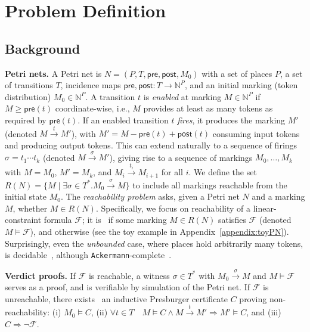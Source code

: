 \vspace{-3.0pt}
\section{Problem Definition}
\label{sec:problem-definition}


\subsection{Background}
\label{subsec:background}

\textbf{Petri nets.} 
A Petri net is $N=(P,T,\mathsf{pre},\mathsf{post},M_0)$ with a set of places $P$, a set of transitions $T$, incidence maps $\mathsf{pre},\mathsf{post}:T\to\mathbb N^P$, and an initial marking (token distribution) $M_0\in\mathbb N^P$.  
A transition $t$ is \textit{enabled} at marking $M \in \mathbb N^P$ if $M\ge \mathsf{pre}(t)$ coordinate-wise, i.e., $M$ provides at least as many tokens as required by $\mathsf{pre}(t)$.
%
If an enabled transition \(t\) \textit{fires}, it produces the marking $M'$ (denoted $M\xrightarrow{t}M'$), with $M'= M - \mathsf{pre}(t) + \mathsf{post}(t)$ consuming input tokens and producing output tokens.
%
This can extend naturally to a sequence of firings $\sigma = t_1\cdots t_k$ (denoted $M \xrightarrow{\sigma} M'$), giving rise to a sequence of markings $M_0,\ldots,M_k$ with $M=M_0$, $M'=M_k$, and $M_i \xrightarrow{t_{i}} M_{i+1}$ for all $i$. 
% 
We define the set $R(N)=\{M \mid \exists \sigma\in T^*. M_0 \xrightarrow{\sigma} M\}$ to include all markings reachable from the initial state $M_0$.
% 
The \textit{reachability problem} asks, given a Petri net $N$ and a marking $M$, whether $M\in R(N)$. 
%
Specifically, we focus on reachability of a linear-constraint formula $\mathcal {F}$; it is \sat\ if some marking $M\in R(N)$ satisfies $\mathcal {F}$ (denoted $M \models \mathcal {F}$), and otherwise \unsat{} (see the toy example in 	Appendix~\ref{appendix:toyPN}).
%
Surprisingly, even the \textit{unbounded} case, where places hold arbitrarily many tokens, is decidable~\cite{Ma81,Ko82,La92}, although \texttt{Ackermann}-complete~\cite{CzWo22,Le22}.   



\medskip
\noindent
\textbf{Verdict proofs.} 
If $\mathcal {F}$ is reachable, a witness $\sigma\in T^*$ with $M_0\xrightarrow{\sigma}M$ and $M\models \mathcal {F}$ serves as a proof, and is verifiable by simulation of the Petri net.  
If $\mathcal {F}$ is unreachable, there exists~\cite{Le09} an inductive Presburger certificate $C$ proving non-reachability: 
(i) $M_0\models C$, (ii) $\forall t\in T \quad M\models C \wedge M\xrightarrow{t}M'\Rightarrow M'\models C$, and (iii) $C\Rightarrow \neg \mathcal {F}$.

